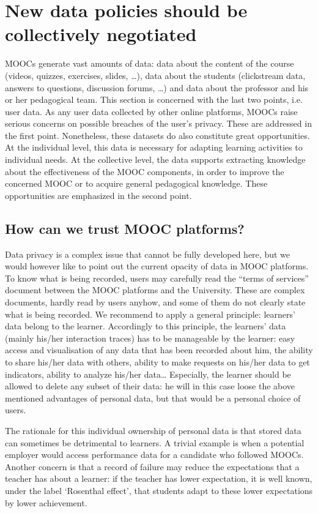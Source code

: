 \section{New data policies should be collectively negotiated}

MOOCs generate vast amounts of data: data about the content of the
course (videos, quizzes, exercises, slides, \ldots{}), data about the
students
(clickstream data, answers to questions, discussion forums, \ldots) and data
about the professor and his or her pedagogical team. This section is
concerned with the last two points, i.e. user data.  As any user data
collected by other online platforms, MOOCs raise serious concerns on
possible breaches of the user's privacy. These are addressed in the
first point. Nonetheless, these datasets do also constitute great
opportunities. At the individual level, this data is necessary for
adapting learning activities to individual needs. At the collective
level, the data supports extracting knowledge about the effectiveness of
the MOOC components, in order to improve the concerned MOOC or to
acquire general pedagogical knowledge. These opportunities are
emphasized in the second point.
      	

\subsection{How can we trust MOOC platforms?}

Data privacy is a complex issue that cannot be fully developed here, but
we would however like to point out the current opacity of data in MOOC
platforms.  To know what is being recorded, users may carefully read the
``terms of services'' document between the MOOC platforms and the
University. These are complex documents, hardly read by users anyhow,
and some of them do not clearly state what is being recorded. We
recommend to apply a general principle: learners' data belong to the
learner. Accordingly to this principle, the learners' data (mainly
his/her interaction traces) has to be manageable by the learner: easy
access and visualisation of any data that has been recorded about him,
the ability to share his/her data with others, ability to make requests
on his/her data to get indicators, ability to analyze his/her
data\ldots{} Especially, the learner should be allowed to delete any
subset
of their data: he will in this case loose the above mentioned advantages
of personal data, but that would be a personal choice of users.

The rationale for this individual ownership of personal data is that
stored data can sometimes be detrimental to learners. A trivial example
is when a potential employer would access performance data for a
candidate who followed MOOCs. Another concern is that a record of
failure may reduce the expectations that a teacher has about a learner:
if the teacher has lower expectation, it is well known, under the label
`Rosenthal effect', that students adapt to these lower expectations by
lower achievement.

